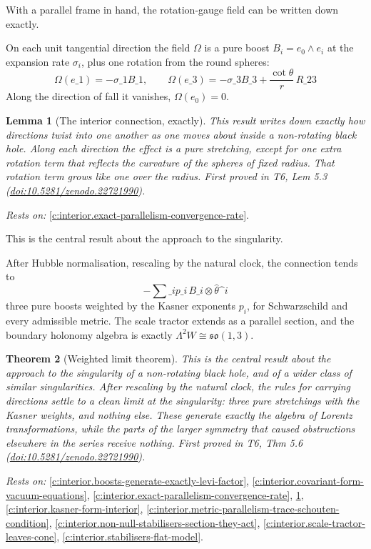 \documentclass[11pt]{article}
\newtheorem{theorem}{Theorem}[section]
\newtheorem{lemma}[theorem]{Lemma}
\theoremstyle{definition}
\theoremstyle{plain}
\begin{document}
With a parallel frame in hand, the rotation-gauge field can be written down exactly.

On each unit tangential direction the field $\Omega$ is a pure boost $B_i = e_0 \wedge e_i$ at the expansion rate $\sigma_i$, plus one rotation from the round spheres: \[ \Omega(e\_1) = -\sigma\_1 B\_1, \qquad \Omega(e\_3) = -\sigma\_3 B\_3 + \frac{\cot\theta}{r}\,R\_{23} \] Along the direction of fall it vanishes, $\Omega(e_0) = 0$.

\begin{lemma}[The interior connection, exactly]\label{c:interior.interior-connection-exactly}
This result writes down exactly how directions twist into one another as one moves about inside a non-rotating black hole. Along each direction the effect is a pure stretching, except for one extra rotation term that reflects the curvature of the spheres of fixed radius. That rotation term grows like one over the radius.
\emph{First proved in} T6, Lem 5.3 (\href{https://doi.org/10.5281/zenodo.22721990}{doi:10.5281/zenodo.22721990}).
\end{lemma}
\noindent\emph{Rests on:} \ref{c:interior.exact-parallelism-convergence-rate}.

This is the central result about the approach to the singularity.

After Hubble normalisation, rescaling by the natural clock, the connection tends to \[ -\sum\_i p\_i\, B\_i \otimes \hat\theta\^{}i \] three pure boosts weighted by the Kasner exponents $p_i$, for Schwarzschild and every admissible metric. The scale tractor extends as a parallel section, and the boundary holonomy algebra is exactly $\Lambda^2 W \cong \mathfrak{so}(1,3)$.

\begin{theorem}[Weighted limit theorem]\label{c:interior.weighted-limit-theorem}
This is the central result about the approach to the singularity of a non-rotating black hole, and of a wider class of similar singularities. After rescaling by the natural clock, the rules for carrying directions settle to a clean limit at the singularity: three pure stretchings with the Kasner weights, and nothing else. These generate exactly the algebra of Lorentz transformations, while the parts of the larger symmetry that caused obstructions elsewhere in the series receive nothing.
\emph{First proved in} T6, Thm 5.6 (\href{https://doi.org/10.5281/zenodo.22721990}{doi:10.5281/zenodo.22721990}).
\end{theorem}
\noindent\emph{Rests on:} \ref{c:interior.boosts-generate-exactly-levi-factor}, \ref{c:interior.covariant-form-vacuum-equations}, \ref{c:interior.exact-parallelism-convergence-rate}, \ref{c:interior.interior-connection-exactly}, \ref{c:interior.kasner-form-interior}, \ref{c:interior.metric-parallelism-trace-schouten-condition}, \ref{c:interior.non-null-stabilisers-section-they-act}, \ref{c:interior.scale-tractor-leaves-cone}, \ref{c:interior.stabilisers-flat-model}.
\end{document}
